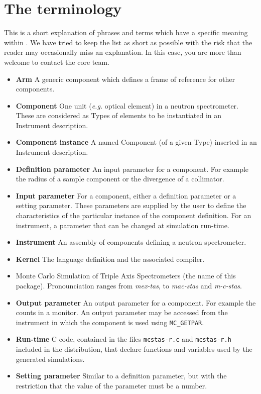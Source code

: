 
\chapter{The \MCS terminology}
\label{s:terminology}

This is a short explanation of phrases and terms which have a specific
meaning within \MCS. We have tried to keep the list as short
as possible with the risk that the reader may occasionally miss
an explanation. In this case, you are more than welcome to contact
the \MCS core team.

\noindent
\begin{itemize}
\item\textbf{Arm}  A generic \MCS component which defines a frame of reference
      for other components.
\item\textbf{Component} One unit ({\em e.g.} optical element) in a neutron
      spectrometer. These are considered as Types of elements to be instantiated in an Instrument description.
\item\textbf{Component instance} A named Component (of a given Type) inserted in an Instrument description.
\item\textbf{Definition parameter} An input parameter for a component. For
  example the radius of a sample component or the divergence of a collimator.
\item\textbf{Input parameter} For a component, either a definition parameter
or a setting parameter. These parameters are supplied by the user to
define the characteristics of the particular instance of the component
definition. For an instrument, a parameter that can be changed at
simulation run-time.
\item\textbf{Instrument} An assembly of \MCS components defining
      a neutron spectrometer.
\item\textbf{Kernel} The \MCS language definition and the associated compiler.
\item\textbf{\MCS} Monte Carlo Simulation of Triple Axis Spectrometers
       (the name of this package).
  Pronounciation ranges from \emph{mex-tas}, to \emph{mac-stas} and \emph{m-c-stas}.
\item\textbf{Output parameter} An output parameter for a component.
  For example the counts in a monitor. An output parameter may be
  accessed from the instrument in which the component is used using
  \verb`MC_GETPAR`.
\item\textbf{Run-time} C code, contained in the files
  \verb+mcstas-r.c+ and \verb+mcstas-r.h+ included in the \MCS
  distribution, that declare functions and variables used by the
  generated simulations.
\item\textbf{Setting parameter} Similar to a definition parameter, but with the
  restriction that the value of the parameter must be a number.
\end{itemize}
